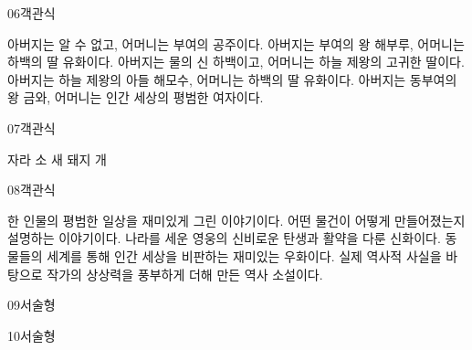 \documentclass[fs9,seriesFre]{korfarm-base}
\begin{document}
\begin{kfQBlock}{06}{객관식}
\begin{kfChoices}
\kfChoice 아버지는 알 수 없고, 어머니는 부여의 공주이다.
\kfChoice 아버지는 부여의 왕 해부루, 어머니는 하백의 딸 유화이다.
\kfChoice 아버지는 물의 신 하백이고, 어머니는 하늘 제왕의 고귀한 딸이다.
\kfChoice 아버지는 하늘 제왕의 아들 해모수, 어머니는 하백의 딸 유화이다.
\kfChoice 아버지는 동부여의 왕 금와, 어머니는 인간 세상의 평범한 여자이다.
\end{kfChoices}
\end{kfQBlock}
\begin{kfQBlock}{07}{객관식}
\begin{kfChoices}
\kfChoice 자라
\kfChoice 소
\kfChoice 새
\kfChoice 돼지
\kfChoice 개
\end{kfChoices}
\end{kfQBlock}
\begin{kfQBlock}{08}{객관식}
\begin{kfChoices}
\kfChoice 한 인물의 평범한 일상을 재미있게 그린 이야기이다.
\kfChoice 어떤 물건이 어떻게 만들어졌는지 설명하는 이야기이다.
\kfChoice 나라를 세운 영웅의 신비로운 탄생과 활약을 다룬 신화이다.
\kfChoice 동물들의 세계를 통해 인간 세상을 비판하는 재미있는 우화이다.
\kfChoice 실제 역사적 사실을 바탕으로 작가의 상상력을 풍부하게 더해 만든 역사 소설이다.
\end{kfChoices}
\end{kfQBlock}
\begin{kfQBlock}{09}{서술형}
\end{kfQBlock}
\begin{kfQBlock}{10}{서술형}
\end{kfQBlock}
\kfEndMC


\end{document}
